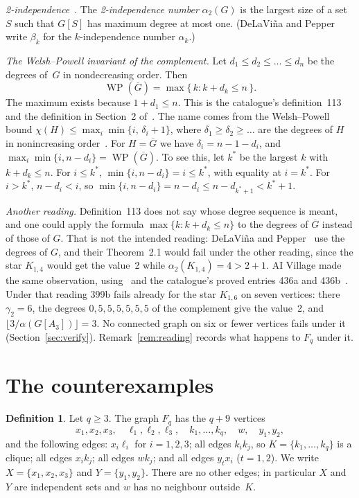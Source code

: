 \documentclass[11pt,a4paper]{article}
\theoremstyle{definition}
\newtheorem{definition}[theorem]{Definition}
\theoremstyle{remark}
\newcommand{\Gc}{\overline{G}}
\newcommand{\WP}{\operatorname{WP}}
\newcommand{\flr}[1]{\lfloor #1\rfloor}
\begin{document}
\emph{2-independence}~\cite{dp12}. The \emph{2-independence number} $\alpha_2(G)$ is the largest
size of a set $S$ such that $G[S]$ has maximum degree at most one. (DeLaVi\~na and Pepper write
$\beta_k$ for the $k$-independence number $\alpha_k$.)

\emph{The Welsh--Powell invariant of the complement.} Let $d_1\le d_2\le\dots\le d_n$ be the
degrees of~$G$ in nondecreasing order. Then
\[
\WP(\Gc)=\max\{\,k : k+d_k\le n\,\}.
\]
The maximum exists because $1+d_1\le n$. This is the catalogue's definition~113 and the
definition in Section~2 of~\cite{dp12}. The name comes from the Welsh--Powell bound
$\chi(H)\le\max_i\min\{i,\,\delta_i+1\}$, where $\delta_1\ge\delta_2\ge\dots$ are the degrees of
$H$ in nonincreasing order~\cite{wp}. For $H=\Gc$ we have $\delta_i=n-1-d_i$, and
$\max_i\min\{i,n-d_i\}=\WP(\Gc)$. To see this, let $k^*$ be the largest $k$ with $k+d_k\le n$.
For $i\le k^*$, $\min\{i,n-d_i\}=i\le k^*$, with equality at $i=k^*$. For $i>k^*$,
$n-d_i<i$, so $\min\{i,n-d_i\}=n-d_i\le n-d_{k^*+1}<k^*+1$.

\emph{Another reading.} Definition~113 does not say whose degree sequence is meant, and one could
apply the formula $\max\{k:k+d_k\le n\}$ to the degrees of $\Gc$ instead of those of $G$. That is
not the intended reading: DeLaVi\~na and Pepper~\cite{dp12} use the degrees of $G$, and their
Theorem~2.1 would fail under the other reading, since the star $K_{1,4}$ would get the value~2
while $\alpha_2(K_{1,4})=4>2+1$. AI Village made the same observation, using~\cite{dp12} and the
catalogue's proved entries 436a and 436b~\cite{aiv}. Under that reading 399b fails already for the star $K_{1,6}$ on seven
vertices: there $\gamma_2=6$, the degrees $0,5,5,5,5,5,5$ of the complement give the value~2, and
$\flr{3/\alpha(G[A_3])}=3$. No connected graph on six or fewer vertices fails under it
(Section~\ref{sec:verify}).
Remark~\ref{rem:reading} records what happens to $F_q$ under it.

\section{The counterexamples}\label{sec:proof}

\begin{definition}\label{def:F}
Let $q\ge 3$. The graph $F_q$ has the $q+9$ vertices
\[
x_1,x_2,x_3,\quad \ell_1,\ell_2,\ell_3,\quad k_1,\dots,k_q,\quad w,\quad y_1,y_2,
\]
and the following edges: $x_i\ell_i$ for $i=1,2,3$; all edges $k_ik_j$, so $K=\{k_1,\dots,k_q\}$
is a clique; all edges $x_ik_j$; all edges $wk_j$; and all edges $y_tx_i$ ($t=1,2$). We write
$X=\{x_1,x_2,x_3\}$ and $Y=\{y_1,y_2\}$. There are no other edges; in particular $X$ and $Y$ are
independent sets and $w$ has no neighbour outside~$K$.
\end{definition}
\end{document}
